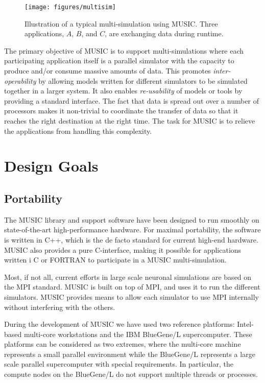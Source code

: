 \documentclass[a4paper,twoside]{report}
\begin{document}
\begin{figure}
  \begin{center}
    \texttt{[image: figures/multisim]}
    \caption[Typical multi-simulation]{\label{fig:multisim}
      Illustration of a typical multi-simulation using MUSIC.  Three
      applications, $A$, $B$, and $C$, are exchanging data during
      runtime.
    }
  \end{center}
\end{figure}

The primary objective of MUSIC is to support multi-simulations where
each participating application itself is a parallel simulator with the
capacity to produce and/or consume massive amounts of data.  This
promotes \emph{inter-operability} by allowing models written for
different simulators to be simulated together in a larger system.  It
also enables \emph{re-usability} of models or tools by providing a
standard interface.  The fact that data is spread out over a number of
processors makes it non-trivial to coordinate the transfer of data so
that it reaches the right destination at the right time.  The task for
MUSIC is to relieve the applications from handling this complexity.


\section{Design Goals}

\subsection{Portability}

The MUSIC library and support software have been designed to run
smoothly on state-of-the-art high-performance hardware.  For maximal
portability, the software is written in C++, which is the
de facto standard for current high-end hardware.  MUSIC also provides a
pure C-interface, making it possible for applications written i C or
FORTRAN to participate in a MUSIC multi-simulation.

Most, if not all, current efforts in large scale neuronal simulations
are based on the MPI standard.  MUSIC is built on top of
MPI, and uses it to run the different simulators.  MUSIC provides
means to allow each simulator to use MPI internally without
interfering with the others.

During the development of MUSIC we have used two reference platforms:
Intel-based multi-core workstations and the IBM
BlueGene/L supercomputer.  These
platforms can be considered as two extremes, where the multi-core
machine represents a small parallel environment while the BlueGene/L
represents a large scale parallel supercomputer with special
requirements.  In particular, the compute nodes on the BlueGene/L do
not support multiple threads or processes.
\end{document}
